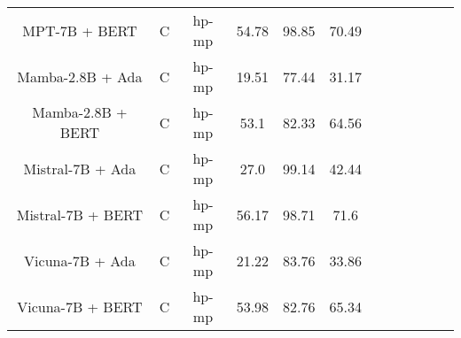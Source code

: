 \begin{table}
\begin{tabular}{|c|c|c|c|c|c|c|c|c|c|c|c|}
	MPT-7B + BERT  & C & hp-mp  &  54.78 &  98.85 & 70.49  \\
	Mamba-2.8B + Ada  & C & hp-mp  &  19.51 &  77.44 & 31.17  \\
	Mamba-2.8B + BERT  & C & hp-mp  &  53.1 &  82.33 & 64.56  \\
	Mistral-7B + Ada  & C & hp-mp  &  27.0 &  99.14 & 42.44  \\
	Mistral-7B + BERT  & C & hp-mp  &  56.17 &  98.71 & 71.6  \\
	Vicuna-7B + Ada  & C & hp-mp  &  21.22 &  83.76 & 33.86  \\
	Vicuna-7B + BERT  & C & hp-mp  &  53.98 &  82.76 & 65.34  \\
	\hline
\end{tabular}
    \end{table}









